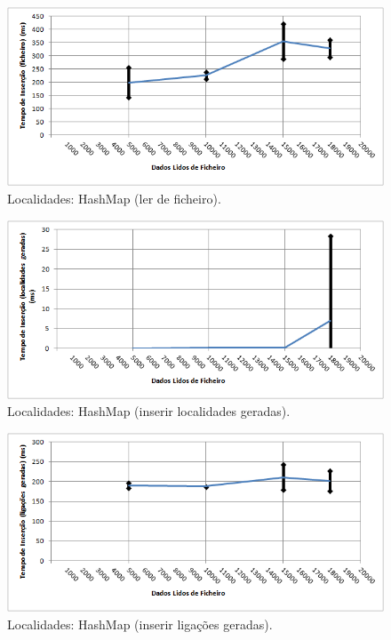 \documentclass[a5paper,twocolumn, 11pt]{article}
\begin{document}
\begin{figure}[h!b!t!]
    \caption[Localidades: HashMap (ler de ficheiro)]{Localidades: HashMap (ler de ficheiro).}
    \label{hashtable}
    \centering
        \includegraphics[width=400pt]{cloc_conf3_o1.png}
\end{figure}
\begin{figure}[h!b!t!]
    \caption[Localidades: HashMap (inserir localidades geradas)]{Localidades: HashMap (inserir localidades geradas).}
    \label{hashtable}
    \centering
        \includegraphics[width=400pt]{cloc_conf3_o2.png}
\end{figure}
\begin{figure}[h!b!t!]
    \caption[Localidades: HashMap (inserir ligações geradas)]{Localidades: HashMap (inserir ligações geradas).}
    \label{hashtable}
    \centering
        \includegraphics[width=400pt]{cloc_conf3_o3.png}
\end{figure}
\end{document}
